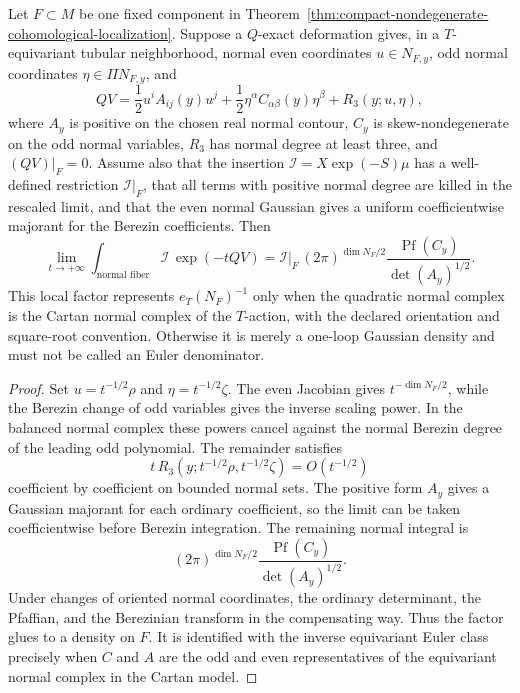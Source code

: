 \begin{lemma}
\label{lem:cohomological-normal-gaussian-euler-factor}
Let \(F\subset M\) be one fixed component in
Theorem~\ref{thm:compact-nondegenerate-cohomological-localization}.  Suppose a
\(Q\)-exact deformation gives, in a \(T\)-equivariant tubular neighborhood,
normal even coordinates \(u\in N_{F,y}\), odd normal coordinates
\(\eta\in\Pi N_{F,y}\), and
\begin{equation}
  QV
  =
  \frac12 u^iA_{ij}(y)u^j
  +
  \frac12 \eta^\alpha C_{\alpha\beta}(y)\eta^\beta
  +
  R_3(y;u,\eta),
  \label{eq:cohomological-normal-quadratic-model}
\end{equation}
where \(A_y\) is positive on the chosen real normal contour, \(C_y\) is
skew-nondegenerate on the odd normal variables, \(R_3\) has normal degree at
least three, and \((QV)|_F=0\).  Assume also that the insertion
\(\mathcal I=X\exp(-S)\mu\) has a well-defined restriction
\(\mathcal I|_F\), that all terms with positive normal degree are killed in
the rescaled limit, and that the even normal Gaussian gives a uniform
coefficientwise majorant for the Berezin coefficients.  Then
\[
  \lim_{t\to+\infty}
  \int_{\text{normal fiber}}
  \mathcal I\,\exp(-tQV)
  =
  \mathcal I|_F\,
  (2\pi)^{\dim N_F/2}
  \frac{\operatorname{Pf}(C_y)}{\det(A_y)^{1/2}} .
\]
This local factor represents \(e_T(N_F)^{-1}\) only when the quadratic normal
complex is the Cartan normal complex of the \(T\)-action, with the declared
orientation and square-root convention.  Otherwise it is merely a one-loop
Gaussian density and must not be called an Euler denominator.
\end{lemma}

\begin{proof}
Set \(u=t^{-1/2}\rho\) and \(\eta=t^{-1/2}\zeta\).  The even Jacobian gives
\(t^{-\dim N_F/2}\), while the Berezin change of odd variables gives the
inverse scaling power.  In the balanced normal complex these powers cancel
against the normal Berezin degree of the leading odd polynomial.  The
remainder satisfies
\[
  t\,R_3(y;t^{-1/2}\rho,t^{-1/2}\zeta)=O(t^{-1/2})
\]
coefficient by coefficient on bounded normal sets.  The positive form \(A_y\)
gives a Gaussian majorant for each ordinary coefficient, so the limit can be
taken coefficientwise before Berezin integration.  The remaining normal
integral is
\begin{equation}
  (2\pi)^{\dim N_F/2}
  \frac{\operatorname{Pf}(C_y)}{\det(A_y)^{1/2}} .
  \label{eq:cohomological-normal-gaussian-euler-factor}
\end{equation}
Under changes of oriented normal coordinates, the ordinary determinant, the
Pfaffian, and the Berezinian transform in the compensating way.  Thus the
factor glues to a density on \(F\).  It is identified with the inverse
equivariant Euler class precisely when \(C\) and \(A\) are the odd and even
representatives of the equivariant normal complex in the Cartan model.
\end{proof}

